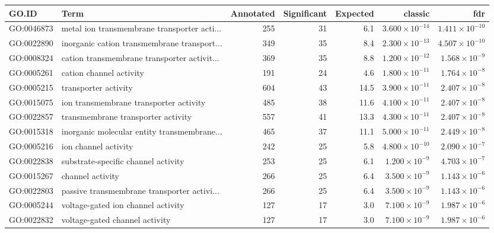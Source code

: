 \begin{table}[ht]
\centering
\begin{adjustbox}{width=\textwidth}

\begin{tabular}{llrrrrr}
  \hline
GO.ID & Term & Annotated & Significant & Expected & classic & fdr \\ 
  \hline
GO:0046873 & metal ion transmembrane transporter acti... & 255 & 31 & 6.1 & $3.600 \times 10^{-14}$ & $1.411 \times 10^{-10}$ \\ 
  GO:0022890 & inorganic cation transmembrane transport... & 349 & 35 & 8.4 & $2.300 \times 10^{-13}$ & $4.507 \times 10^{-10}$ \\ 
  GO:0008324 & cation transmembrane transporter activit... & 369 & 35 & 8.8 & $1.200 \times 10^{-12}$ & $1.568 \times 10^{-9}$ \\ 
  GO:0005261 & cation channel activity & 191 & 24 & 4.6 & $1.800 \times 10^{-11}$ & $1.764 \times 10^{-8}$ \\ 
  GO:0005215 & transporter activity & 604 & 43 & 14.5 & $3.900 \times 10^{-11}$ & $2.407 \times 10^{-8}$ \\ 
  GO:0015075 & ion transmembrane transporter activity & 485 & 38 & 11.6 & $4.100 \times 10^{-11}$ & $2.407 \times 10^{-8}$ \\ 
  GO:0022857 & transmembrane transporter activity & 557 & 41 & 13.3 & $4.300 \times 10^{-11}$ & $2.407 \times 10^{-8}$ \\ 
  GO:0015318 & inorganic molecular entity transmembrane... & 465 & 37 & 11.1 & $5.000 \times 10^{-11}$ & $2.449 \times 10^{-8}$ \\ 
  GO:0005216 & ion channel activity & 242 & 25 & 5.8 & $4.800 \times 10^{-10}$ & $2.090 \times 10^{-7}$ \\ 
  GO:0022838 & substrate-specific channel activity & 253 & 25 & 6.1 & $1.200 \times 10^{-9}$ & $4.703 \times 10^{-7}$ \\ 
  GO:0015267 & channel activity & 266 & 25 & 6.4 & $3.500 \times 10^{-9}$ & $1.143 \times 10^{-6}$ \\ 
  GO:0022803 & passive transmembrane transporter activi... & 266 & 25 & 6.4 & $3.500 \times 10^{-9}$ & $1.143 \times 10^{-6}$ \\ 
  GO:0005244 & voltage-gated ion channel activity & 127 & 17 & 3.0 & $7.100 \times 10^{-9}$ & $1.987 \times 10^{-6}$ \\ 
  GO:0022832 & voltage-gated channel activity & 127 & 17 & 3.0 & $7.100 \times 10^{-9}$ & $1.987 \times 10^{-6}$ \\ 

\end{tabular}
\end{adjustbox}
\end{table}
